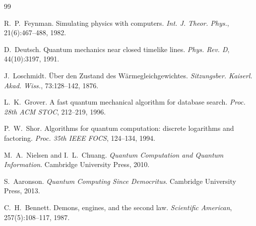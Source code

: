 \documentclass[12pt,a4paper]{article}
\begin{document}

\begin{thebibliography}{99}

R.~P.~Feynman.
\newblock Simulating physics with computers.
\newblock \emph{Int. J. Theor. Phys.}, 21(6):467--488, 1982.

D.~Deutsch.
\newblock Quantum mechanics near closed timelike lines.
\newblock \emph{Phys. Rev. D}, 44(10):3197, 1991.

J.~Loschmidt.
\newblock \"{U}ber den Zustand des W\"{a}rmegleichgewichtes.
\newblock \emph{Sitzungsber. Kaiserl. Akad. Wiss.}, 73:128--142, 1876.

L.~K.~Grover.
\newblock A fast quantum mechanical algorithm for database search.
\newblock \emph{Proc. 28th ACM STOC}, 212--219, 1996.

P.~W.~Shor.
\newblock Algorithms for quantum computation: discrete logarithms and factoring.
\newblock \emph{Proc. 35th IEEE FOCS}, 124--134, 1994.

M.~A.~Nielsen and I.~L.~Chuang.
\newblock \emph{Quantum Computation and Quantum Information}.
\newblock Cambridge University Press, 2010.

S.~Aaronson.
\newblock \emph{Quantum Computing Since Democritus}.
\newblock Cambridge University Press, 2013.

C.~H.~Bennett.
\newblock Demons, engines, and the second law.
\newblock \emph{Scientific American}, 257(5):108--117, 1987.

\end{thebibliography}
\end{document}
